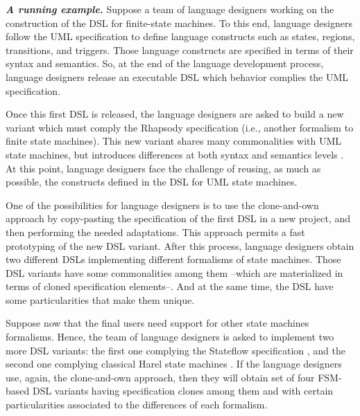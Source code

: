 

\vspace{2mm}
\textit{\textbf{A running example.}} Suppose a team of language designers working on the construction of the DSL for finite-state machines. To this end, language designers follow the UML specification \cite{UML:2011} to define language constructs such as states, regions, transitions, and triggers. Those language constructs are specified in terms of their syntax and semantics. So, at the end of the language development process, language designers release an executable DSL which behavior complies the UML specification.

Once this first DSL is released, the language designers are asked to build a new variant which must comply the Rhapsody specification \cite{Harel:2004} (i.e., another formalism to finite state machines). This new variant shares many commonalities with UML state machines, but introduces differences at both syntax and semantics levels \cite{Crane:2007}. At this point, language designers face the challenge of reusing, as much as possible, the constructs defined in the DSL for UML state machines.

One of the possibilities for language designers is to use the clone-and-own approach by copy-pasting the specification of the first DSL in a new project, and then performing the needed adaptations. This approach permits a fast prototyping of the new DSL variant. After this process, language designers obtain two different DSLs implementing different formalisms of state machines. Those DSL variants have some commonalities among them --which are materialized in terms of cloned specification elements--. And at the same time, the DSL have some particularities that make them unique. 

Suppose now that the final users need support for other state machines formalisms. Hence, the team of language designers is asked to implement two more DSL variants: the first one complying the Stateflow specification \cite{Martaj:2010}, and the second one complying classical Harel state machines \cite{Harel:1996}. If the language designers use, again, the clone-and-own approach, then they will obtain set of four FSM-based DSL variants having specification clones among them and with certain particularities associated to the differences of each formalism. %


